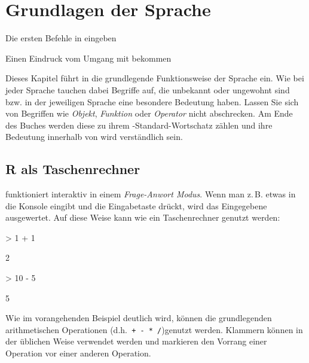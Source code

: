 

\chapter{Grundlagen der Sprache}  \label{sec:grundlagen_sprache}

\begin{lernzielbox} 
 \item Die ersten Befehle in \R{} eingeben 
 \item Einen Eindruck vom Umgang mit \R{} bekommen
\end{lernzielbox}  

Dieses Kapitel führt in die grundlegende Funktionsweise der Sprache \R{} ein. Wie bei jeder Sprache tauchen dabei Begriffe auf, die unbekannt oder ungewohnt sind bzw. in der jeweiligen Sprache eine besondere Bedeutung haben. Lassen Sie sich von Begriffen wie \emph{Objekt}, \emph{Funktion} oder \emph{Operator} nicht abschrecken. Am Ende des Buches werden diese zu ihrem \R{}-Standard-Wortschatz zählen und ihre Bedeutung innerhalb von \R{} wird verständlich sein.
 

\section{R als Taschenrechner}

\R{} funktioniert interaktiv in einem \emph{Frage-Anwort Modus}. Wenn man z.\,B. etwas in die Konsole eingibt und die Eingabetaste drückt, wird das Eingegebene ausgewertet. Auf diese Weise kann \R{} wie ein Taschenrechner genutzt werden:

\begin{Schunk}
\begin{Sinput}
> 1 + 1
\end{Sinput}
\begin{Soutput}
[1] 2
\end{Soutput}
\begin{Sinput}
> 10 - 5
\end{Sinput}
\begin{Soutput}
[1] 5
\end{Soutput}
\end{Schunk}

Wie im vorangehenden Beispiel deutlich wird, können die grundlegenden arithmetischen Operationen (d.h.\texttt{ + - * /})genutzt werden. Klammern können in der üblichen Weise verwendet werden und markieren den Vorrang einer Operation vor einer anderen Operation.

